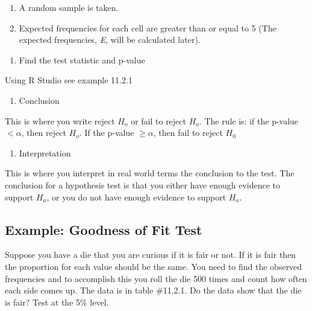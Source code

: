 \documentclass[
]{book}
\providecommand{\tightlist}{%
  \setlength{\itemsep}{0pt}\setlength{\parskip}{0pt}}
\begin{document}
\begin{enumerate}
\def\labelenumi{\alph{enumi}.}
\item
  A random sample is taken.
\item
  Expected frequencies for each cell are greater than or equal to 5 (The expected frequencies, \emph{E}, will be calculated later).
\end{enumerate}

\begin{enumerate}
\def\labelenumi{\arabic{enumi}.}
\setcounter{enumi}{2}
\tightlist
\item
  Find the test statistic and p-value
\end{enumerate}

Using R Studio see example 11.2.1

\begin{enumerate}
\def\labelenumi{\arabic{enumi}.}
\setcounter{enumi}{3}
\tightlist
\item
  Conclusion
\end{enumerate}

This is where you write reject \(H_o\) or fail to reject \(H_o\). The rule is: if the p-value \(<\alpha\), then reject \(H_o\). If the p-value \(\ge \alpha\), then fail to reject \(H_0\)

\begin{enumerate}
\def\labelenumi{\arabic{enumi}.}
\setcounter{enumi}{4}
\tightlist
\item
  Interpretation
\end{enumerate}

This is where you interpret in real world terms the conclusion to the test. The conclusion for a hypothesis test is that you either have enough evidence to support \(H_a\), or you do not have enough evidence to support \(H_a\).

\hypertarget{example-goodness-of-fit-test}{%
\subsection{Example: Goodness of Fit Test}\label{example-goodness-of-fit-test}}

Suppose you have a die that you are curious if it is fair or not. If it is fair then the proportion for each value should be the same. You need to find the observed frequencies and to accomplish this you roll the die 500 times and count how often each side comes up. The data is in table \#11.2.1. Do the data show that the die is fair? Test at the 5\% level.
\end{document}
